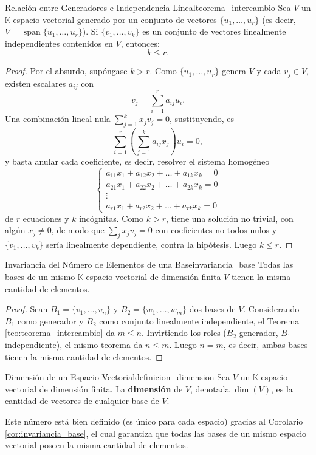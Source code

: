 \documentclass[11pt, a4paper]{article}
\begin{document}
\begin{teorema}{Relación entre Generadores e Independencia Lineal}{teorema_intercambio}
Sea $V$ un $\mathbb{K}$-espacio vectorial generado por un conjunto de vectores $\{u_1, \dots, u_r\}$ (es decir, $V = \operatorname{span}\{u_1, \dots, u_r\}$).
Si $\{v_1, \dots, v_k\}$ es un conjunto de vectores linealmente independientes contenidos en $V$, entonces:
\[
k \le r.
\]
\end{teorema}

\begin{proof}
Por el absurdo, supóngase $k > r$. Como $\{u_1, \dots, u_r\}$ genera $V$ y cada $v_j \in V$, existen escalares $a_{ij}$ con
\[
v_j = \sum_{i=1}^{r} a_{ij} u_i.
\]
Una combinación lineal nula $\sum_{j=1}^{k} x_j v_j = 0$, sustituyendo, es
\[
\sum_{i=1}^{r} \left( \sum_{j=1}^{k} a_{ij} x_j \right) u_i = 0,
\]
y basta anular cada coeficiente, es decir, resolver el sistema homogéneo
\[
\begin{cases}
a_{11}x_1 + a_{12}x_2 + \dots + a_{1k}x_k = 0 \\
a_{21}x_1 + a_{22}x_2 + \dots + a_{2k}x_k = 0 \\
\vdots \\
a_{r1}x_1 + a_{r2}x_2 + \dots + a_{rk}x_k = 0
\end{cases}
\]
de $r$ ecuaciones y $k$ incógnitas. Como $k > r$, tiene una solución no trivial, con algún $x_j \neq 0$, de modo que $\sum_{j} x_j v_j = 0$ con coeficientes no todos nulos y $\{v_1, \dots, v_k\}$ sería linealmente dependiente, contra la hipótesis. Luego $k \le r$.
\end{proof}

\begin{corolario}{Invariancia del Número de Elementos de una Base}{invariancia_base}
Todas las bases de un mismo $\mathbb{K}$-espacio vectorial de dimensión finita $V$ tienen la misma cantidad de elementos.
\end{corolario}

\begin{proof}
Sean $B_1 = \{v_1, \dots, v_n\}$ y $B_2 = \{w_1, \dots, w_m\}$ dos bases de $V$. Considerando $B_1$ como generador y $B_2$ como conjunto linealmente independiente, el Teorema \ref{teo:teorema_intercambio} da $m \le n$. Invirtiendo los roles ($B_2$ generador, $B_1$ independiente), el mismo teorema da $n \le m$. Luego $n = m$, es decir, ambas bases tienen la misma cantidad de elementos.
\end{proof}

\begin{definicion}{Dimensión de un Espacio Vectorial}{definicion_dimension}
Sea $V$ un $\mathbb{K}$-espacio vectorial de dimensión finita.
La \textbf{dimensión} de $V$, denotada $\dim(V)$, es la cantidad de vectores de cualquier base de $V$.

Este número está bien definido (es único para cada espacio) gracias al Corolario \ref{cor:invariancia_base}, el cual garantiza que todas las bases de un mismo espacio vectorial poseen la misma cantidad de elementos.
\end{definicion}
\end{document}
